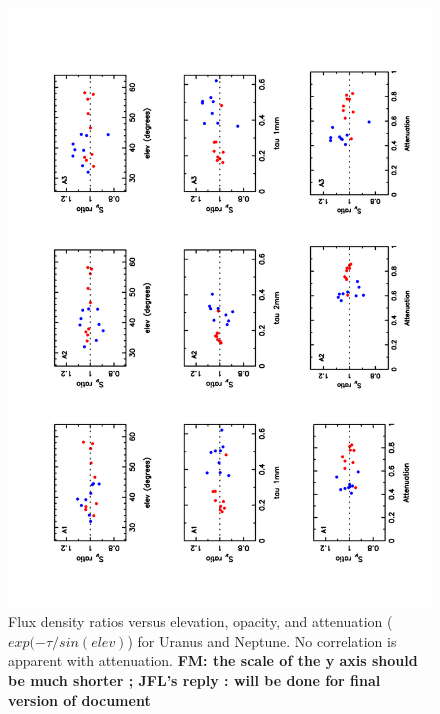 \begin{figure}[p]
\begin{center}
  \includegraphics[clip, angle=-90, scale=0.6]{Figures/Ura_Nep_ratio_vs_elev_tau_attenuation_r9_r10.pdf}
  \caption{Flux density ratios versus elevation, opacity, and attenuation ($exp(-\tau/sin(elev)$) for Uranus and Neptune.
    No correlation is apparent with attenuation. {\bf FM: the scale of
      the y axis should be much shorter  ;   JFL's reply  : will be done for final
    version of document}}
\label{fig:ratio_vs_att}
\end{center}
\end{figure}


